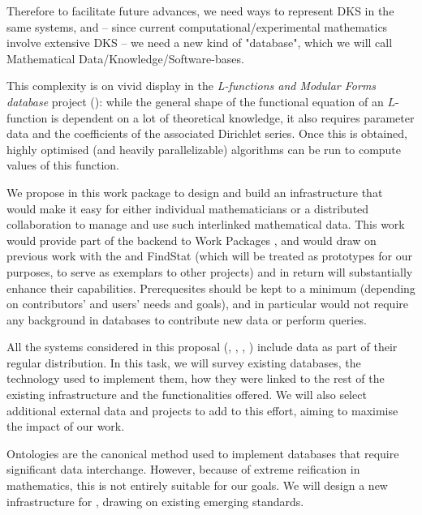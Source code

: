 \begin{workpackage}[id=dksbases,wphases=1-48!.5,
  title=Data/Knowledge/Software-Bases,lead=JU,
  ZHRM=1,JURM=36,USHRM=12,UWRM=3]
\begin{wpdescription}
Therefore to facilitate future advances, we need ways to represent DKS in the same systems, and -- since current computational/experimental mathematics involve extensive DKS -- we need a new kind of "database", which we will call Mathematical Data/Knowledge/Software-bases.

This complexity is on vivid display in the \emph{L-functions and Modular Forms database} project (\LMFDB): while the general shape of the functional equation of an $L$-function is dependent on a lot of theoretical knowledge, it also requires parameter data and the coefficients of the associated Dirichlet series. Once this is obtained, highly optimised (and heavily parallelizable) algorithms can be run to compute values of this function. 

We propose in this work package to design and build an infrastructure that would make it
easy for either individual mathematicians or a distributed collaboration to manage and use
such interlinked mathematical data. This work would provide part of the backend to Work
Packages , and would draw on previous work with
the \LMFDB and FindStat (which will be treated as prototypes for our purposes, to serve as
exemplars to other projects) and in return will substantially enhance their
capabilities. Prerequesites should be kept to a minimum (depending on contributors' and
users' needs and goals), and in particular would not require any background in databases
to contribute new data or perform queries.
\end{wpdescription}
\begin{tasklist}
\begin{task}[title=Survey of existing databases,id=data-assessment]
All the systems considered in this proposal (\GAP, \Sage, \Pari, \Singular) include data as part of their regular distribution. In this task, we will survey existing databases, the technology used to implement them, how they were linked to the rest of the existing infrastructure and the functionalities offered. We will also select additional external data and projects to add to this effort, aiming to maximise the impact of our work. 
\end{task}

\begin{task}[title={Design of new infrastructure, formulation of requirements}, id=data-design]
Ontologies are the canonical method used to implement databases that require significant data interchange. However, because of extreme reification in mathematics, this is not entirely suitable for our goals. We will design a new infrastructure for \TheProject, drawing on existing emerging standards. 


\end{task}
\end{tasklist}
\end{workpackage}

